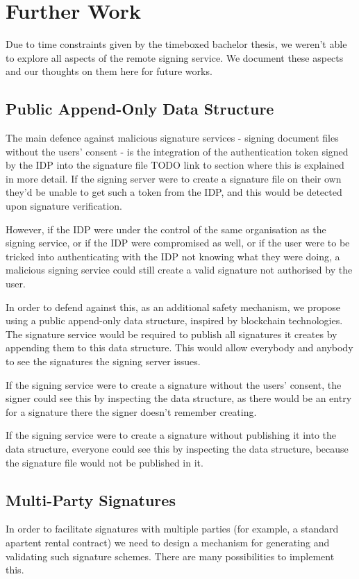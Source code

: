 \chapter{Further Work}\label{ch:further-work}
Due to time constraints given by the timeboxed bachelor thesis, we weren't able to explore all aspects of the remote signing service.
We document these aspects and our thoughts on them here for future works.

\section{Public Append-Only Data Structure}\label{sec:public-append-only-data-structure}
The main defence against malicious signature services - signing document files without the users' consent - is the integration of the authentication token signed by the \gls{IDP} into the signature file TODO link to section where this is explained in more detail.
If the signing server were to create a signature file on their own they'd be unable to get such a token from the \gls{IDP}, and this would be detected upon signature verification.

However, if the \gls{IDP} were under the control of the same organisation as the signing service,
or if the \gls{IDP} were compromised as well,
or if the user were to be tricked into authenticating with the \gls{IDP} not knowing what they were doing,
a malicious signing service could still create a valid signature not authorised by the user.

In order to defend against this, as an additional safety mechanism, we propose using a public append-only data structure,
inspired by blockchain technologies.
The signature service would be required to publish all signatures it creates by appending them to this data structure.
This would allow everybody and anybody to see the signatures the signing server issues.

If the signing service were to create a signature without the users' consent,
the signer could see this by inspecting the data structure,
as there would be an entry for a signature there the signer doesn't remember creating.

If the signing service were to create a signature without publishing it into the data structure,
everyone could see this by inspecting the data structure,
because the signature file would not be published in it.


\section{Multi-Party Signatures}\label{sec:multi-party-signatures}
In order to facilitate signatures with multiple parties (for example, a standard apartent rental contract) we need to design a mechanism for generating and validating such signature schemes.
There are many possibilities to implement this.


